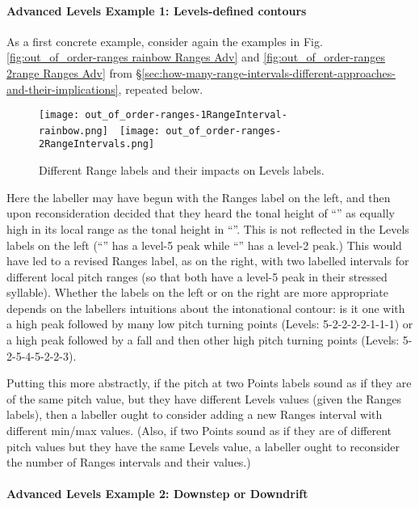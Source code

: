 \paragraph{Advanced Levels Example 1: Levels-defined contours}

As a first concrete example, consider again the examples in Fig. \ref{fig:out_of_order-ranges rainbow Ranges Adv} and \ref{fig:out_of_order-ranges 2range Ranges Adv} from §\ref{sec:how-many-range-intervals-different-approaches-and-their-implications}, repeated below.

\begin{figure}[H]
\centering
%
\texttt{[image: out\_of\_order-ranges-1RangeInterval-rainbow.png]}~~\texttt{[image: out\_of\_order-ranges-2RangeIntervals.png]}
%
\caption{Different Range labels and their impacts on Levels labels.%
\label{fig:out of order Levels Adv}%
}
\end{figure}

Here the labeller may have begun with the Ranges label on the left, and then upon reconsideration decided that they heard the tonal height of “” as equally high in its local range as the tonal height in “”. This is not reflected in the Levels labels on the left (“” has a  level-5 peak while “” has a level-2 peak.) This would have led to a revised Ranges label, as on the right, with two labelled intervals for different local pitch ranges (so that both have a level-5 peak in their stressed syllable). Whether the labels on the left or on the right are more appropriate depends on the labellers intuitions about the intonational contour: is it one with a high peak followed by many low pitch turning points (Levels: 5-2-2-2-2-1-1-1) or a high peak followed by a fall and then other high pitch turning points (Levels: 5-2-5-4-5-2-2-3).

Putting this more abstractly, if the pitch at two Points labels sound as if they are of the same pitch value, but they have different Levels values (given the Ranges labels), then a labeller ought to consider adding a new Ranges interval with different min\slash max values. (Also, if two Points sound as if they are of different pitch values but they have the same Levels value, a labeller ought to reconsider the number of Ranges intervals and their values.)

\paragraph{Advanced Levels Example 2: Downstep or Downdrift}

